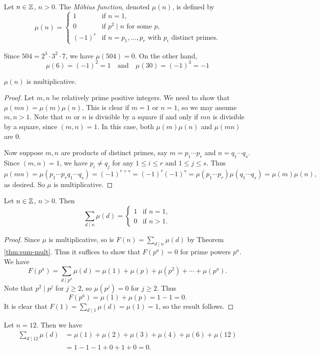 \begin{definition}
  Let $n \in \mathbb{Z}$, $n > 0$. The
  \emph{M\"obius function}, denoted
  $\mu(n)$, is defined by
  \[
    \mu(n) =
    \begin{cases}
      1 & \text{if } n = 1, \\
      0 & \text{if } p^2 \mid n \text{ for some } p, \\
      (-1)^r & \text{if $n = p_1, \dots, p_r$ with $p_i$ distinct primes}.
    \end{cases}
  \]
\end{definition}

\begin{example}
  Since $504 = 2^3 \cdot 3^2 \cdot 7$,
  we have $\mu(504) = 0$. On the other
  hand,
  \[\mu(6) = (-1)^2 = 1 \quad \text{and}\quad
  \mu(30) = (-1)^3 = -1\]
\end{example}

\begin{theorem}
  $\mu(n)$ is multiplicative.
\end{theorem}

\begin{proof}
  Let $m, n$ be relatively prime
  positive integers. We need to show
  that $\mu(mn) = \mu(m) \mu(n)$.
  This is clear if $m = 1$ or $n = 1$,
  so we may assume $m, n > 1$.
  Note that $m$ or $n$ is divisible
  by a square if and only if $mn$
  is divisible by a square, since
  $(m, n) = 1$. In this case, both
  $\mu(m) \mu(n)$ and $\mu(mn)$ are $0$.

  Now suppose $m, n$ are products
  of distinct primes, say
  $m = p_1 \cdots p_r$ and
  $n = q_1 \cdots q_s$. Since
  $(m, n) = 1$, we have $p_i \ne q_j$
  for any $1 \le i \le r$ and
  $1 \le j \le s$. Thus
  \[
    \mu(mn)
    = \mu(p_1 \cdots p_r q_1 \cdots q_s)
    = (-1)^{r + s}
    = (-1)^r (-1)^s
    = \mu(p_1 \cdots p_r) \mu(q_1 \cdots q_s)
    = \mu(m) \mu(n),
  \]
  as desired. So $\mu$ is multiplicative.
\end{proof}

\begin{prop}\label{prop:mobius-sum}
  Let $n \in \mathbb{Z}$, $n > 0$. Then
  \[
    \sum_{d \mid n} \mu(d)
    =
    \begin{cases}
      1 & \text{if } n = 1, \\
      0 & \text{if } n > 1.
    \end{cases}
  \]
\end{prop}

\begin{proof}
  Since $\mu$ is multiplicative,
  so is $F(n) = \sum_{d \mid n} \mu(d)$
  by Theorem \ref{thm:sum-mult}. Thus
  it suffices to show that
  $F(p^a) = 0$ for prime powers $p^a$.
  We have
  \[
    F(p^a)
    = \sum_{d \mid p^a} \mu(d)
    = \mu(1) + \mu(p) + \mu(p^2) + \cdots + \mu(p^a).
  \]
  Note that $p^2 \mid p^j$ for $j \ge 2$,
  so $\mu(p^j) = 0$ for $j \ge 2$.
  Thus
  \[
    F(p^a) = \mu(1) + \mu(p) = 1 - 1 = 0.
  \]
  It is clear that
  $F(1) = \sum_{d \mid 1} \mu(d) = \mu(1) = 1$, so
  the result follows.
\end{proof}

\begin{example}
  Let $n = 12$. Then we have
  \begin{align*}
    \sum_{d \mid 12} \mu(d)
    &= \mu(1) + \mu(2) + \mu(3) + \mu(4) + \mu(6) + \mu(12) \\
    &= 1 - 1 - 1 + 0 + 1 + 0
    = 0.
  \end{align*}
\end{example}
